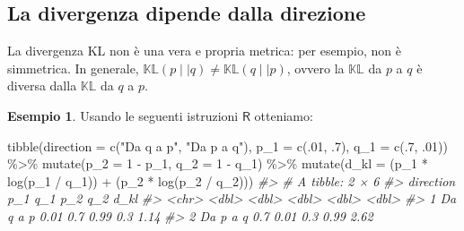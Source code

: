 \documentclass[
  10pt,
  italian,
  a4paper,
  extrafontsizes,onecolumn,openright
  ]{memoir}
\newenvironment{Shaded}{\begin{snugshade}}{\end{snugshade}}
\newcommand{\AttributeTok}[1]{\textcolor[rgb]{0.77,0.63,0.00}{#1}}
\newcommand{\CommentTok}[1]{\textcolor[rgb]{0.56,0.35,0.01}{\textit{#1}}}
\newcommand{\DecValTok}[1]{\textcolor[rgb]{0.00,0.00,0.81}{#1}}
\newcommand{\FunctionTok}[1]{\textcolor[rgb]{0.00,0.00,0.00}{#1}}
\newcommand{\NormalTok}[1]{#1}
\newcommand{\SpecialCharTok}[1]{\textcolor[rgb]{0.00,0.00,0.00}{#1}}
\newcommand{\StringTok}[1]{\textcolor[rgb]{0.31,0.60,0.02}{#1}}
\newcommand{\R}{\textsf{R}} %
\theoremstyle{definition}
\theoremstyle{definition}
\newtheorem{example}{Esempio}[chapter]
\theoremstyle{definition}
\theoremstyle{definition}
\theoremstyle{remark}
\begin{document}
\hypertarget{la-divergenza-dipende-dalla-direzione}{%
\subsection{La divergenza dipende dalla direzione}\label{la-divergenza-dipende-dalla-direzione}}

La divergenza KL non è una vera e propria metrica: per esempio, non è simmetrica. In generale, \(\mathbb{KL}(p \mid\mid q) \neq \mathbb{KL}(q \mid\mid p)\), ovvero la \(\mathbb{KL}\) da \(p\) a \(q\) è diversa dalla \(\mathbb{KL}\) da \(q\) a \(p\).

\begin{example}

Usando le seguenti istruzioni \(\R\) otteniamo:

\begin{Shaded}
\begin{Highlighting}[]
\FunctionTok{tibble}\NormalTok{(}\AttributeTok{direction =} \FunctionTok{c}\NormalTok{(}\StringTok{"Da q a p"}\NormalTok{, }\StringTok{"Da p a q"}\NormalTok{),}
       \AttributeTok{p\_1 =} \FunctionTok{c}\NormalTok{(.}\DecValTok{01}\NormalTok{, .}\DecValTok{7}\NormalTok{),}
       \AttributeTok{q\_1 =} \FunctionTok{c}\NormalTok{(.}\DecValTok{7}\NormalTok{, .}\DecValTok{01}\NormalTok{)) }\SpecialCharTok{\%\textgreater{}\%}
  \FunctionTok{mutate}\NormalTok{(}\AttributeTok{p\_2 =} \DecValTok{1} \SpecialCharTok{{-}}\NormalTok{ p\_1,}
         \AttributeTok{q\_2 =} \DecValTok{1} \SpecialCharTok{{-}}\NormalTok{ q\_1) }\SpecialCharTok{\%\textgreater{}\%}
  \FunctionTok{mutate}\NormalTok{(}\AttributeTok{d\_kl =}\NormalTok{ (p\_1 }\SpecialCharTok{*} \FunctionTok{log}\NormalTok{(p\_1 }\SpecialCharTok{/}\NormalTok{ q\_1)) }\SpecialCharTok{+}\NormalTok{ (p\_2 }\SpecialCharTok{*} \FunctionTok{log}\NormalTok{(p\_2 }\SpecialCharTok{/}\NormalTok{ q\_2)))}
\CommentTok{\#\textgreater{} \# A tibble: 2 × 6}
\CommentTok{\#\textgreater{}   direction   p\_1   q\_1   p\_2   q\_2  d\_kl}
\CommentTok{\#\textgreater{}   \textless{}chr\textgreater{}     \textless{}dbl\textgreater{} \textless{}dbl\textgreater{} \textless{}dbl\textgreater{} \textless{}dbl\textgreater{} \textless{}dbl\textgreater{}}
\CommentTok{\#\textgreater{} 1 Da q a p   0.01  0.7   0.99  0.3   1.14}
\CommentTok{\#\textgreater{} 2 Da p a q   0.7   0.01  0.3   0.99  2.62}
\end{Highlighting}
\end{Shaded}

\end{example}
\end{document}

